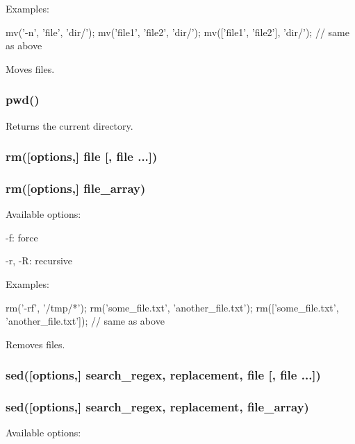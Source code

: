 Examples\+:


\begin{DoxyCode}
mv('-n', 'file', 'dir/');
mv('file1', 'file2', 'dir/');
mv(['file1', 'file2'], 'dir/'); // same as above
\end{DoxyCode}


Moves files.

\subsubsection*{pwd()}

Returns the current directory.

\subsubsection*{rm(\mbox{[}options,\mbox{]} file \mbox{[}, file ...\mbox{]})}

\subsubsection*{rm(\mbox{[}options,\mbox{]} file\+\_\+array)}

Available options\+:


\begin{DoxyItemize}
\item {\ttfamily -\/f}\+: force
\item {\ttfamily -\/r, -\/R}\+: recursive
\end{DoxyItemize}

Examples\+:


\begin{DoxyCode}
rm('-rf', '/tmp/*');
rm('some\_file.txt', 'another\_file.txt');
rm(['some\_file.txt', 'another\_file.txt']); // same as above
\end{DoxyCode}


Removes files.

\subsubsection*{sed(\mbox{[}options,\mbox{]} search\+\_\+regex, replacement, file \mbox{[}, file ...\mbox{]})}

\subsubsection*{sed(\mbox{[}options,\mbox{]} search\+\_\+regex, replacement, file\+\_\+array)}

Available options\+:


